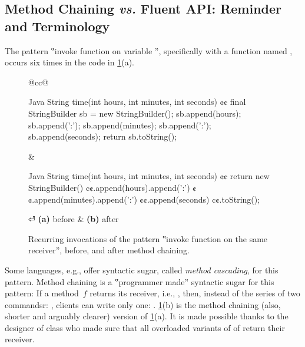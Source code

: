 \subsection{Method Chaining \emph{vs.} Fluent API: Reminder and Terminology}
The pattern ‟invoke function on variable ”, specifically with
  a function named , occurs
six times in the code in \cref{Figure:chaining}(a).

\begin{figure}[H]
  \caption{\label{Figure:chaining}%
    Recurring invocations of the pattern ‟invoke function on the same
      receiver”, before, and after method chaining.
  }%
    \begin{tabular}{@{}cc@{}}%
  \begin{lcode}[minipage,width=44ex,box align=center]{Java}
String time(int hours, int minutes, int seconds) {¢¢
  final StringBuilder sb = new StringBuilder();
  sb.append(hours);
  sb.append(':');
  sb.append(minutes);
  sb.append(':');
  sb.append(seconds);
  return sb.toString();
}\end{lcode}
\hfill
&
\hspace{1ex}
  \begin{lcode}[minipage,width=44ex,box align=center]{Java}
String time(int hours, int minutes, int seconds) {¢¢
    return new StringBuilder()
      ¢¢.append(hours).append(':')
      ¢¢.append(minutes).append(':')
      ¢¢.append(seconds)
      ¢¢.toString();
}\end{lcode}
⏎
\textbf{(a)} before & \textbf{(b)} after
\end{tabular}
\end{figure}

Some languages, e.g., \Smalltalk offer syntactic sugar, called \emph{method cascading}, for this pattern.
Method chaining is a ‟programmer made” syntactic sugar for this pattern:
  If a method~$f$ returns its receiver, i.e., ,
  then, instead of the series of two commandsr: \mbox{}, clients can write
  only one: \mbox{}.
  \cref{Figure:chaining}(b) is the method chaining
  (also, shorter and arguably clearer) version of
  \cref{Figure:chaining}(a).
It is made possible thanks to the designer of class  who made sure that all overloaded variants of
  of  return their receiver.

